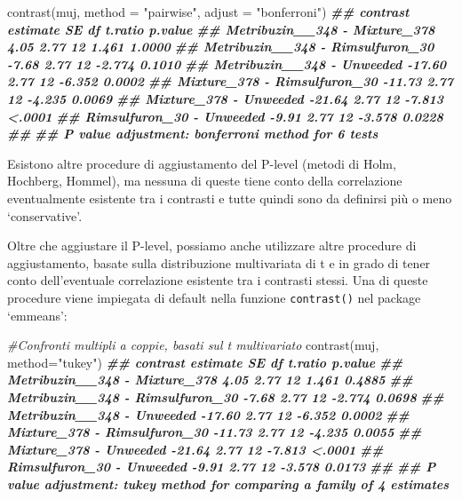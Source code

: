 \documentclass[
  12pt,
]{book}
\newenvironment{Shaded}{\begin{snugshade}}{\end{snugshade}}
\newcommand{\AttributeTok}[1]{\textcolor[rgb]{0.77,0.63,0.00}{#1}}
\newcommand{\CommentTok}[1]{\textcolor[rgb]{0.56,0.35,0.01}{\textit{#1}}}
\newcommand{\DocumentationTok}[1]{\textcolor[rgb]{0.56,0.35,0.01}{\textbf{\textit{#1}}}}
\newcommand{\FunctionTok}[1]{\textcolor[rgb]{0.00,0.00,0.00}{#1}}
\newcommand{\NormalTok}[1]{#1}
\newcommand{\StringTok}[1]{\textcolor[rgb]{0.31,0.60,0.02}{#1}}
\begin{document}
\begin{Shaded}
\begin{Highlighting}[]
\FunctionTok{contrast}\NormalTok{(muj, }\AttributeTok{method =} \StringTok{"pairwise"}\NormalTok{, }\AttributeTok{adjust =} \StringTok{"bonferroni"}\NormalTok{)}
\DocumentationTok{\#\#  contrast                         estimate   SE df t.ratio p.value}
\DocumentationTok{\#\#  Metribuzin\_\_348 {-} Mixture\_378        4.05 2.77 12   1.461  1.0000}
\DocumentationTok{\#\#  Metribuzin\_\_348 {-} Rimsulfuron\_30    {-}7.68 2.77 12  {-}2.774  0.1010}
\DocumentationTok{\#\#  Metribuzin\_\_348 {-} Unweeded         {-}17.60 2.77 12  {-}6.352  0.0002}
\DocumentationTok{\#\#  Mixture\_378 {-} Rimsulfuron\_30       {-}11.73 2.77 12  {-}4.235  0.0069}
\DocumentationTok{\#\#  Mixture\_378 {-} Unweeded             {-}21.64 2.77 12  {-}7.813  \textless{}.0001}
\DocumentationTok{\#\#  Rimsulfuron\_30 {-} Unweeded           {-}9.91 2.77 12  {-}3.578  0.0228}
\DocumentationTok{\#\# }
\DocumentationTok{\#\# P value adjustment: bonferroni method for 6 tests}
\end{Highlighting}
\end{Shaded}

Esistono altre procedure di aggiustamento del P-level (metodi di Holm, Hochberg, Hommel), ma nessuna di queste tiene conto della correlazione eventualmente esistente tra i contrasti e tutte quindi sono da definirsi più o meno `conservative'.

Oltre che aggiustare il P-level, possiamo anche utilizzare altre procedure di aggiustamento, basate sulla distribuzione multivariata di t e in grado di tener conto dell'eventuale correlazione esistente tra i contrasti stessi. Una di queste procedure viene impiegata di default nella funzione \texttt{contrast()} nel package `emmeans':

\small

\begin{Shaded}
\begin{Highlighting}[]
\CommentTok{\#Confronti multipli a coppie, basati sul t multivariato}
\FunctionTok{contrast}\NormalTok{(muj, }\AttributeTok{method=}\StringTok{"tukey"}\NormalTok{)}
\DocumentationTok{\#\#  contrast                         estimate   SE df t.ratio p.value}
\DocumentationTok{\#\#  Metribuzin\_\_348 {-} Mixture\_378        4.05 2.77 12   1.461  0.4885}
\DocumentationTok{\#\#  Metribuzin\_\_348 {-} Rimsulfuron\_30    {-}7.68 2.77 12  {-}2.774  0.0698}
\DocumentationTok{\#\#  Metribuzin\_\_348 {-} Unweeded         {-}17.60 2.77 12  {-}6.352  0.0002}
\DocumentationTok{\#\#  Mixture\_378 {-} Rimsulfuron\_30       {-}11.73 2.77 12  {-}4.235  0.0055}
\DocumentationTok{\#\#  Mixture\_378 {-} Unweeded             {-}21.64 2.77 12  {-}7.813  \textless{}.0001}
\DocumentationTok{\#\#  Rimsulfuron\_30 {-} Unweeded           {-}9.91 2.77 12  {-}3.578  0.0173}
\DocumentationTok{\#\# }
\DocumentationTok{\#\# P value adjustment: tukey method for comparing a family of 4 estimates}
\end{Highlighting}
\end{Shaded}
\end{document}
